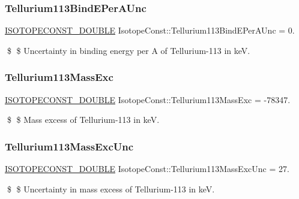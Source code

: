 \subsubsection{\texorpdfstring{Tellurium113\+Bind\+E\+Per\+A\+Unc}{Tellurium113BindEPerAUnc}}
{\footnotesize\ttfamily \mbox{\hyperlink{group___isotope_const-_macros_ga8f45a7272ce02c0b4c65c44636ed719a}{I\+S\+O\+T\+O\+P\+E\+C\+O\+N\+S\+T\+\_\+\+D\+O\+U\+B\+LE}} Isotope\+Const\+::\+Tellurium113\+Bind\+E\+Per\+A\+Unc = 0.}

\$ \$ Uncertainty in binding energy per A of Tellurium-\/113 in keV. \mbox{\label{group___isotope_const-_tellurium-_te113_gac07e8a2174f40d483354a4aaac367448}} 
\subsubsection{\texorpdfstring{Tellurium113\+Mass\+Exc}{Tellurium113MassExc}}
{\footnotesize\ttfamily \mbox{\hyperlink{group___isotope_const-_macros_ga8f45a7272ce02c0b4c65c44636ed719a}{I\+S\+O\+T\+O\+P\+E\+C\+O\+N\+S\+T\+\_\+\+D\+O\+U\+B\+LE}} Isotope\+Const\+::\+Tellurium113\+Mass\+Exc = -\/78347.}

\$ \$ Mass excess of Tellurium-\/113 in keV. \mbox{\label{group___isotope_const-_tellurium-_te113_gae1acf3a3a4144caefc2928f12975ca07}} 
\subsubsection{\texorpdfstring{Tellurium113\+Mass\+Exc\+Unc}{Tellurium113MassExcUnc}}
{\footnotesize\ttfamily \mbox{\hyperlink{group___isotope_const-_macros_ga8f45a7272ce02c0b4c65c44636ed719a}{I\+S\+O\+T\+O\+P\+E\+C\+O\+N\+S\+T\+\_\+\+D\+O\+U\+B\+LE}} Isotope\+Const\+::\+Tellurium113\+Mass\+Exc\+Unc = 27.}

\$ \$ Uncertainty in mass excess of Tellurium-\/113 in keV. \mbox{\label{group___isotope_const-_tellurium-_te113_gaae2b54ff259f6c2a7e7f860a3666b7d8}} 
